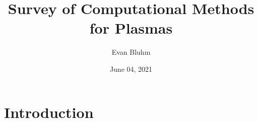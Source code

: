 \documentclass[%
 reprint,
 amsmath,amssymb,
 aps,
]{revtex4-2}
\begin{document}

\title{Survey of Computational Methods for Plasmas}%

\author{Evan Bluhm}


\date{June 04, 2021}%
\begin{abstract}

\blindtext
\end{abstract}

\maketitle


\section{Introduction}


\blinddocument



\nocite{*}



\onecolumngrid

\pagebreak

\appendix
\end{document}

